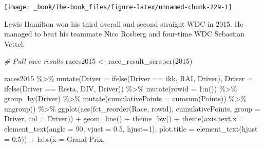 \documentclass[
]{book}
\newenvironment{Shaded}{\begin{snugshade}}{\end{snugshade}}
\newcommand{\AttributeTok}[1]{\textcolor[rgb]{0.77,0.63,0.00}{#1}}
\newcommand{\CommentTok}[1]{\textcolor[rgb]{0.56,0.35,0.01}{\textit{#1}}}
\newcommand{\DecValTok}[1]{\textcolor[rgb]{0.00,0.00,0.81}{#1}}
\newcommand{\FloatTok}[1]{\textcolor[rgb]{0.00,0.00,0.81}{#1}}
\newcommand{\FunctionTok}[1]{\textcolor[rgb]{0.00,0.00,0.00}{#1}}
\newcommand{\NormalTok}[1]{#1}
\newcommand{\OtherTok}[1]{\textcolor[rgb]{0.56,0.35,0.01}{#1}}
\newcommand{\SpecialCharTok}[1]{\textcolor[rgb]{0.00,0.00,0.00}{#1}}
\newcommand{\StringTok}[1]{\textcolor[rgb]{0.31,0.60,0.02}{#1}}
\begin{document}
\begin{center}\texttt{[image: \_book/The-book\_files/figure-latex/unnamed-chunk-229-1]} \end{center}

Lewis Hamilton won his third overall and second straight WDC in 2015. He managed to beat his teammate Nico Rosberg and four-time WDC Sebastian Vettel.

\begin{Shaded}
\begin{Highlighting}[]
\CommentTok{\# Pull race results}
\NormalTok{races2015 }\OtherTok{\textless{}{-}} \FunctionTok{race\_result\_scraper}\NormalTok{(}\DecValTok{2015}\NormalTok{)}

\NormalTok{races2015 }\SpecialCharTok{\%\textgreater{}\%}
  \FunctionTok{mutate}\NormalTok{(}\AttributeTok{Driver =} \FunctionTok{ifelse}\NormalTok{(Driver }\SpecialCharTok{==} \StringTok{\textquotesingle{}ikk\textquotesingle{}}\NormalTok{, }\StringTok{\textquotesingle{}RAI\textquotesingle{}}\NormalTok{, Driver),}
         \AttributeTok{Driver =} \FunctionTok{ifelse}\NormalTok{(Driver }\SpecialCharTok{==} \StringTok{\textquotesingle{}Resta\textquotesingle{}}\NormalTok{, }\StringTok{\textquotesingle{}DIV\textquotesingle{}}\NormalTok{, Driver)) }\SpecialCharTok{\%\textgreater{}\%} 
  \FunctionTok{mutate}\NormalTok{(}\AttributeTok{rowid =} \DecValTok{1}\SpecialCharTok{:}\FunctionTok{n}\NormalTok{()) }\SpecialCharTok{\%\textgreater{}\%}
  \FunctionTok{group\_by}\NormalTok{(Driver) }\SpecialCharTok{\%\textgreater{}\%} 
  \FunctionTok{mutate}\NormalTok{(}\AttributeTok{cumulativePoints =} \FunctionTok{cumsum}\NormalTok{(Points)) }\SpecialCharTok{\%\textgreater{}\%}
  \FunctionTok{ungroup}\NormalTok{() }\SpecialCharTok{\%\textgreater{}\%} 
  \FunctionTok{ggplot}\NormalTok{(}\FunctionTok{aes}\NormalTok{(}\FunctionTok{fct\_reorder}\NormalTok{(Race, rowid), cumulativePoints,}
         \AttributeTok{group =}\NormalTok{ Driver, }\AttributeTok{col =}\NormalTok{ Driver)) }\SpecialCharTok{+}
  \FunctionTok{geom\_line}\NormalTok{() }\SpecialCharTok{+}
  \FunctionTok{theme\_bw}\NormalTok{() }\SpecialCharTok{+} 
  \FunctionTok{theme}\NormalTok{(}\AttributeTok{axis.text.x =} \FunctionTok{element\_text}\NormalTok{(}\AttributeTok{angle =} \DecValTok{90}\NormalTok{, }\AttributeTok{vjust =} \FloatTok{0.5}\NormalTok{, }\AttributeTok{hjust=}\DecValTok{1}\NormalTok{),}
        \AttributeTok{plot.title =} \FunctionTok{element\_text}\NormalTok{(}\AttributeTok{hjust =} \FloatTok{0.5}\NormalTok{)) }\SpecialCharTok{+}
  \FunctionTok{labs}\NormalTok{(}\AttributeTok{x =} \StringTok{\textquotesingle{}Grand Prix\textquotesingle{}}\NormalTok{,}

\end{Highlighting}
\end{Shaded}
\end{document}
